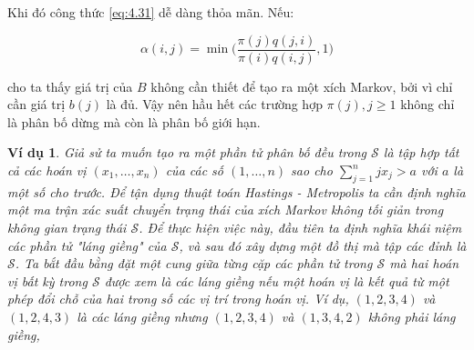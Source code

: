 \documentclass[14pt, a4paper]{article}
\numberwithin{equation}{section}
\numberwithin{figure}{section}
\theoremstyle{sltheorem}
\newtheorem{vd}{Ví dụ}
\theoremstyle{soltheorem}
\numberwithin{dl}{section}
\numberwithin{md}{section}
\numberwithin{vd}{section}
\begin{document}
    Khi đó công thức \ref{eq:4.31} dễ dàng thỏa mãn. Nếu:

    \begin{equation*}
        \alpha(i, j) = \min \Bigg ( \dfrac{\pi(j)q(j, i)}{\pi(i) q(i, j)}, 1 \Bigg)
    \end{equation*}

    cho ta thấy giá trị của $B$ không cần thiết để tạo ra một xích Markov, bởi vì chỉ cần giá trị $b(j)$ là đủ.
    Vậy nên hầu hết các trường hợp $\pi(j), j \geq 1$ không chỉ là phân bố dừng mà còn là phân bố giới hạn.

    \begin{vd}
        Giả sử ta muốn tạo ra một phần tử phân bố đều trong $\mathscr{S}$ là tập hợp tất cả các hoán vị $(x_1, \dots, x_n)$ của các số $(1, \dots, n)$ sao cho $\sum_{j=1}^n j x_j > a$ với $a$ là một số cho trước.
        Để tận dụng thuật toán Hastings - Metropolis ta cần định nghĩa một ma trận xác suất chuyển trạng thái của xích Markov không tối giản trong không gian trạng thái $\mathscr{S}$.
        Để thực hiện việc này, đầu tiên ta định nghĩa khái niệm các phần tử "láng giềng" của $\mathscr{S}$, và sau đó xây dựng một đồ thị mà tập các đỉnh là $\mathscr{S}$.
        Ta bắt đầu bằng đặt một cung giữa từng cặp các phần tử trong $\mathscr{S}$ mà hai hoán vị bất kỳ trong $\mathscr{S}$ được xem là các láng giềng nếu một hoán vị là kết quả từ một phép đổi chỗ của hai trong số các vị trí trong hoán vị.
        Ví dụ, $(1, 2, 3, 4)$ và $(1, 2, 4, 3)$ là các láng giềng nhưng $(1, 2, 3, 4)$ và $(1, 3, 4, 2)$ không phải láng giềng,
        
    \end{vd}
\end{document}

